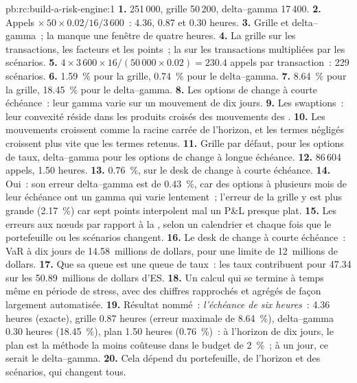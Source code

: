 \begin{solution}{pb:rc:build-a-risk-engine:1}
\textbf{1.}  251\,000, grille 50\,200, delta--gamma 17\,400.
\textbf{2.} Appels $\times\,50\times0.02/16/3\,600$~: 4.36, 0.87 et 0.30 heures.
\textbf{3.} Grille et delta--gamma~; la  manque une fenêtre de quatre heures.
\textbf{4.} La grille sur les transactions, les facteurs et les points~; la  sur les transactions multipliées par les scénarios.
\textbf{5.} $4\times3\,600\times16/(50\,000\times0.02) = 230.4$ appels par transaction~: 229 scénarios.
\textbf{6.} 1.59~\% pour la grille, 0.74~\% pour le delta--gamma.
\textbf{7.} 8.64~\% pour la grille, 18.45~\% pour le delta--gamma.
\textbf{8.} Les options de change à courte échéance~: leur gamma varie sur un mouvement de dix jours.
\textbf{9.} Les swaptions~: leur convexité réside dans les produits croisés des mouvements des .
\textbf{10.} Les mouvements croissent comme la racine carrée de l'horizon, et les termes négligés croissent plus vite que les
termes retenus.
\textbf{11.} Grille par défaut,  pour les options de taux, delta--gamma pour les options de change à longue échéance.
\textbf{12.} 86\,604 appels, 1.50 heures.
\textbf{13.} 0.76~\%, sur le desk de change à courte échéance.
\textbf{14.} Oui~: son erreur delta--gamma est de 0.43~\%, car des options à plusieurs mois de leur échéance ont un gamma qui varie lentement~;
l'erreur de la grille y est plus grande (2.17~\%) car sept points interpolent mal un P\&L presque plat.
\textbf{15.} Les erreurs aux nœuds par rapport à la , selon un calendrier et chaque fois que le portefeuille ou les scénarios changent.
\textbf{16.} Le desk de change à courte échéance~: VaR à dix jours de 14.58~millions de dollars, pour une limite de 12~millions de dollars.
\textbf{17.} Que sa queue est une queue de taux~: les taux contribuent pour 47.34 sur les 50.89~millions de dollars d'ES.
\textbf{18.} Un calcul qui se termine à temps même en période de stress, avec des chiffres rapprochés et agrégés de façon largement
automatisée.
\textbf{19.} Résultat nommé~: \emph{l'échéance de six heures}~:  4.36 heures (exacte), grille 0.87 heures
(erreur maximale de 8.64~\%), delta--gamma 0.30 heures (18.45~\%), plan 1.50 heures (0.76~\%)~: à l'horizon de dix jours, le plan
est la méthode la moins coûteuse dans le budget de 2~\%~; à un jour, ce serait le delta--gamma.
\textbf{20.} Cela dépend du portefeuille, de l'horizon et des scénarios, qui changent tous.
\end{solution}

